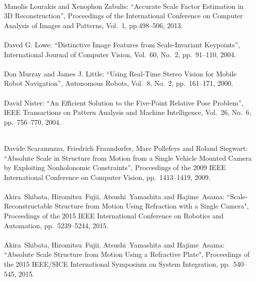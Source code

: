 \begin{mythebibliography}{}
\leavevmode \\Manolis Lourakis and Xenophon Zabulis:
\newblock ``Accurate Scale Factor Estimation in 3D Reconstruction'',
\newblock Proceedings of the International Conference on Computer Analysis of Images and Patterns, Vol.~1, pp.498--506, 2013.
\\

\leavevmode \\Daved G. Lowe:
\newblock ``Distinctive Image Features from Scale-Invariant Keypoints'',
\newblock International Journal of Computer Vision, Vol.~60, No.~2, pp.~91--110, 2004.
\\

\leavevmode \\Don Murray and James J. Little:
\newblock ``Using Real-Time Stereo Vision for Mobile Robot Navigation'',
\newblock Autonomous Robots, Vol.~8, No.~2, pp.~161--171, 2000.
\\

\leavevmode \\David Nister:
\newblock ``An Efficient Solution to the Five-Point Relative Pose Problem'',
\newblock IEEE Transactions on Pattern Analysis and Machine Intelligence, Vol.~26, No.~6, pp.~756--770, 2004.
\\

\newpage

\leavevmode \\Davide Scaramuzza, Friedrich Fraundorfer, Marc Pollefeys and Roland Siegwart:
\newblock ``Absolute Scale in Structure from Motion from a Single Vehicle Mounted Camera by Exploiting Nonholonomic Constraints'',
\newblock Proceedings of the 2009 IEEE International Conference on Computer Vision, pp.~1413--1419, 2009.
\\



\leavevmode \\Akira~Shibata, Hiromitsu~Fujii, Atsushi~Yamashita and Hajime~Asama:
\newblock``Scale-Reconstructable Structure from Motion Using Refraction with a Single Camera",
\newblock Proceedings of the 2015 IEEE International Conference on Robotics and Automation, pp.~5239--5244, 2015.
\\

\leavevmode \\Akira~Shibata, Hiromitsu~Fujii, Atsushi~Yamashita and Hajime~Asama:
\newblock``Absolute Scale Structure from Motion Using a Refractive Plate",
\newblock Proceedings of the 2015 IEEE/SICE International Symposium on System Integration, pp.~540--545, 2015.
\\


\end{mythebibliography}
